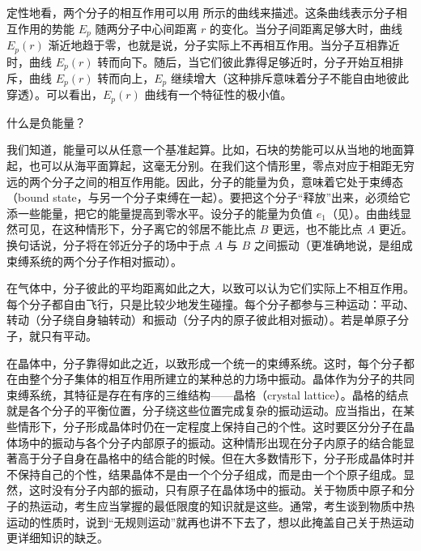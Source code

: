 \begin{dialogue}
\tchr 定性地看，两个分子的相互作用可以用 所示的曲线来描述。这条曲线表示分子相互作用的势能 $E_{p}$ 随两分子中心间距离 $r$ 的变化。当分子间距离足够大时，曲线 $E_{p}(r)$ 渐近地趋于零，也就是说，分子实际上不再相互作用。当分子互相靠近时，曲线 $E_{p}(r)$ 转而向下。随后，当它们彼此靠得足够近时，分子开始互相排斥，曲线 $E_{p}(r)$ 转而向上，$E_{p}$ 继续增大（这种排斥意味着分子不能自由地彼此穿透）。可以看出，$E_{p}(r)$ 曲线有一个特征性的极小值。

\stdb 什么是负能量？

\tchr 我们知道，能量可以从任意一个基准起算。比如，石块的势能可以从当地的地面算起，也可以从海平面算起，这毫无分别。在我们这个情形里，零点对应于相距无穷远的两个分子之间的相互作用能。因此，分子的能量为负，意味着它处于束缚态（bound state，与另一个分子束缚在一起）。要把这个分子“释放”出来，必须给它添一些能量，把它的能量提高到零水平。设分子的能量为负值 $e_{1}$（见）。由曲线显然可见，在这种情形下，分子离它的邻居不能比点 $B$ 更远，也不能比点 $A$ 更近。换句话说，分子将在邻近分子的场中于点 $A$ 与 $B$ 之间振动（更准确地说，是组成束缚系统的两个分子作相对振动）。

在气体中，分子彼此的平均距离如此之大，以致可以认为它们实际上不相互作用。每个分子都自由飞行，只是比较少地发生碰撞。每个分子都参与三种运动：平动、转动（分子绕自身轴转动）和振动（分子内的原子彼此相对振动）。若是单原子分子，就只有平动。

在晶体中，分子靠得如此之近，以致形成一个统一的束缚系统。这时，每个分子都在由整个分子集体的相互作用所建立的某种总的力场中振动。晶体作为分子的共同束缚系统，其特征是存在有序的三维结构——晶格（crystal lattice）。晶格的结点就是各个分子的平衡位置，分子绕这些位置完成复杂的振动运动。应当指出，在某些情形下，分子形成晶体时仍在一定程度上保持自己的个性。这时要区分分子在晶体场中的振动与各个分子内部原子的振动。这种情形出现在分子内原子的结合能显著高于分子自身在晶格中的结合能的时候。但在大多数情形下，分子形成晶体时并不保持自己的个性，结果晶体不是由一个个分子组成，而是由一个个原子组成。显然，这时没有分子内部的振动，只有原子在晶体场中的振动。关于物质中原子和分子的热运动，考生应当掌握的最低限度的知识就是这些。通常，考生谈到物质中热运动的性质时，说到“无规则运动”就再也讲不下去了，想以此掩盖自己关于热运动更详细知识的缺乏。


\end{dialogue}
